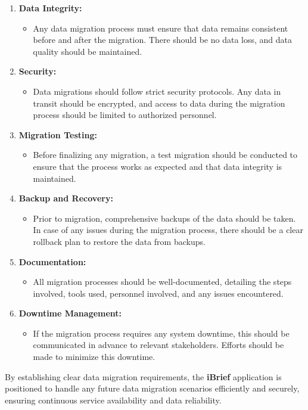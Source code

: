 \begin{enumerate}
    \item \textbf{Data Integrity:}
    \begin{itemize}
        \item Any data migration process must ensure that data remains consistent before and after the migration. There should be no data loss, and data quality should be maintained.
    \end{itemize}
    
    \item \textbf{Security:}
    \begin{itemize}
        \item Data migrations should follow strict security protocols. Any data in transit should be encrypted, and access to data during the migration process should be limited to authorized personnel.
    \end{itemize}
    
    \item \textbf{Migration Testing:}
    \begin{itemize}
        \item Before finalizing any migration, a test migration should be conducted to ensure that the process works as expected and that data integrity is maintained.
    \end{itemize}
    
    \item \textbf{Backup and Recovery:}
    \begin{itemize}
        \item Prior to migration, comprehensive backups of the data should be taken. In case of any issues during the migration process, there should be a clear rollback plan to restore the data from backups.
    \end{itemize}
    
    \item \textbf{Documentation:}
    \begin{itemize}
        \item All migration processes should be well-documented, detailing the steps involved, tools used, personnel involved, and any issues encountered.
    \end{itemize}
    
    \item \textbf{Downtime Management:}
    \begin{itemize}
        \item If the migration process requires any system downtime, this should be communicated in advance to relevant stakeholders. Efforts should be made to minimize this downtime.
    \end{itemize}
\end{enumerate}

By establishing clear data migration requirements, the \textbf{iBrief} application is positioned to handle any future data migration scenarios efficiently and securely, ensuring continuous service availability and data reliability.
